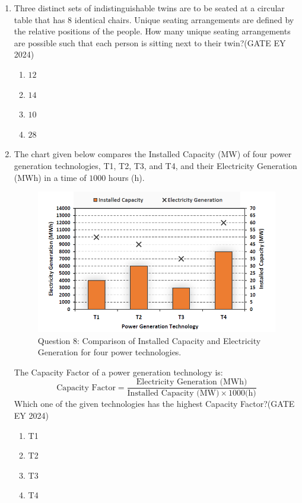 \begin{enumerate}
\item Three distinct sets of indistinguishable twins are to be seated at a circular table that has $8$ identical chairs. Unique seating arrangements are defined by the relative positions of the people. How many unique seating arrangements are possible such that each person is sitting next to their twin?\hfill{(GATE EY 2024)}
    \begin{multicols}{2}
    \begin{enumerate}
        \item $12$
        \item $14$
        \item $10$
        \item $28$
    \end{enumerate}
    \end{multicols}

\item The chart given below compares the Installed Capacity (MW) of four power generation technologies, T1, T2, T3, and T4, and their Electricity Generation (MWh) in a time of $1000$ hours (h).
\begin{figure}[H]
    \centering
    \includegraphics[width=0.3\columnwidth]{figs/Q-8.png}
    \caption{Question 8: Comparison of Installed Capacity and Electricity Generation for four power technologies.}
    \label{Q.8}
\end{figure}
The Capacity Factor of a power generation technology is:
$$ \text{Capacity Factor} = \frac{\text{Electricity Generation (MWh)}}{\text{Installed Capacity (MW)} \times 1000 \text{(h)}} $$
Which one of the given technologies has the highest Capacity Factor?\hfill{(GATE EY 2024)}
    \begin{multicols}{2}
    \begin{enumerate}
        \item T1
        \item T2
        \item T3
        \item T4
    \end{enumerate}
    \end{multicols}


\end{enumerate}
